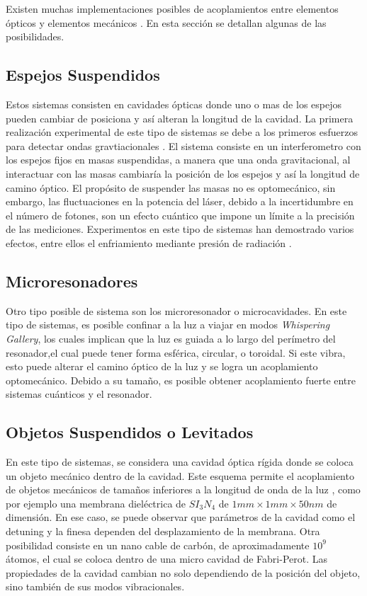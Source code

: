 \documentclass[a4paper,10pt]{report}
\begin{document}
Existen muchas implementaciones posibles de acoplamientos entre elementos ópticos y elementos mecánicos \cite{KippenberCO}. En esta sección se detallan algunas de las posibilidades.

\subsection{Espejos Suspendidos}

Estos sistemas consisten en cavidades ópticas donde uno o mas de los espejos pueden cambiar de posiciona y así alteran la longitud de la cavidad. La primera realización experimental de este tipo de sistemas se debe a los primeros esfuerzos para detectar ondas gravtiacionales \cite{AbramoviciLIGO}. El sistema consiste en un interferometro con los espejos fijos en masas suspendidas, a manera que una onda gravitacional, al interactuar con las masas cambiaría la posición de los espejos y así la longitud de camino óptico. El propósito de suspender las masas no es optomecánico, sin embargo, las fluctuaciones en la potencia del láser, debido a la incertidumbre en el número de fotones, son un efecto cuántico que impone un límite a la precisión de las mediciones\cite{CavesIF}. Experimentos en este tipo de sistemas han demostrado varios efectos, entre ellos el enfriamiento mediante presión de radiación \cite{CorbittOC}.

\subsection{Microresonadores}

Otro tipo posible de sistema son los microresonador o microcavidades. En este tipo de sistemas, es posible confinar a la luz a viajar en modos \textit{Whispering Gallery}, los cuales implican que la luz es guiada a lo largo del perímetro del resonador,el cual puede tener forma esférica, circular, o toroidal\cite{VahalaOM}. Si este vibra, esto puede alterar el camino óptico de la luz y se logra un acoplamiento optomecánico. Debido a su tamaño, es posible obtener acoplamiento fuerte entre sistemas cuánticos y el resonador\cite{VerhagenMOC}.

\subsection{Objetos Suspendidos o Levitados}

En este tipo de sistemas, se considera una cavidad óptica rígida donde se coloca un objeto mecánico dentro de la cavidad. Este esquema permite el acoplamiento de objetos mecánicos de tamaños inferiores a la longitud de onda de la luz \cite{KippenberCO}, como por ejemplo una membrana dieléctrica de $SI_3N_4$ de  $1mm \times 1mm \times 50nm$
de dimensión\cite{SankeyMC}. En ese caso, se puede observar que parámetros de la cavidad como el detuning y la finesa dependen del desplazamiento de la membrana. Otra posibilidad consiste en un nano cable de carbón, de aproximadamente $10^9$ átomos, el cual se coloca dentro de una micro cavidad de Fabri-Perot. Las propiedades de la cavidad cambian no solo dependiendo de la posición del objeto, sino también de sus modos vibracionales\cite{FaveroCR}.  
\end{document}
